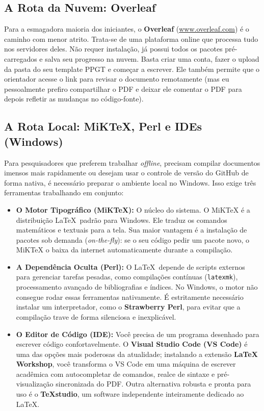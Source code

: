 \documentclass[a4paper,12pt]{article}
\begin{document}
\subsection{A Rota da Nuvem: Overleaf}

Para a esmagadora maioria dos iniciantes, o \textbf{Overleaf} (\url{www.overleaf.com}) é o caminho com menor atrito. Trata-se de uma plataforma online que processa tudo nos servidores deles. Não requer instalação, já possui todos os pacotes pré-carregados e salva seu progresso na nuvem. Basta criar uma conta, fazer o upload da pasta do seu template PPGT e começar a escrever. Ele também permite que o orientador acesse o link para revisar o documento remotamente (mas eu pessoalmente prefiro compartilhar o PDF e deixar ele comentar o PDF para depois refletir as mudanças no código-fonte).

\subsection{A Rota Local: MiKTeX, Perl e IDEs (Windows)}

Para pesquisadores que preferem trabalhar \textit{offline}, precisam compilar documentos imensos mais rapidamente ou desejam usar o controle de versão do GitHub de forma nativa, é necessário preparar o ambiente local no Windows. Isso exige três ferramentas trabalhando em conjunto:

\begin{itemize}
    \item \textbf{O Motor Tipográfico (MiKTeX):} O núcleo do sistema. O MiKTeX é a distribuição \LaTeX \ padrão para Windows. Ele traduz os comandos matemáticos e textuais para a tela. Sua maior vantagem é a instalação de pacotes sob demanda (\textit{on-the-fly}): se o seu código pedir um pacote novo, o MiKTeX o baixa da internet automaticamente durante a compilação.
    \item \textbf{A Dependência Oculta (Perl):} O \LaTeX \ depende de scripts externos para gerenciar tarefas pesadas, como compilações contínuas (\texttt{latexmk}), processamento avançado de bibliografias e índices. No Windows, o motor não consegue rodar essas ferramentas nativamente. É estritamente necessário instalar um interpretador, como o \textbf{Strawberry Perl}, para evitar que a compilação trave de forma silenciosa e inexplicável.
    \item \textbf{O Editor de Código (IDE):} Você precisa de um programa desenhado para escrever código confortavelmente. O \textbf{Visual Studio Code (VS Code)} é uma das opções mais poderosas da atualidade; instalando a extensão \textbf{LaTeX Workshop}, você transforma o VS Code em uma máquina de escrever acadêmica com autocompletar de comandos, realce de sintaxe e pré-visualização sincronizada do PDF. Outra alternativa robusta e pronta para uso é o \textbf{TeXstudio}, um software independente inteiramente dedicado ao LaTeX.
\end{itemize}
\end{document}
